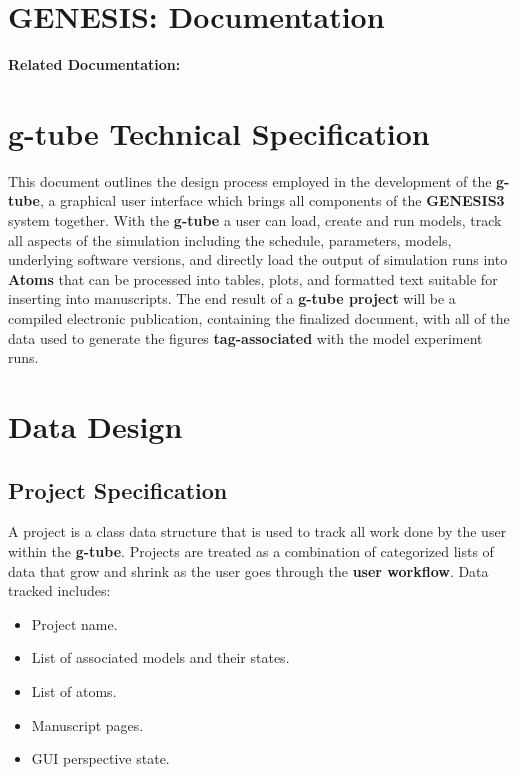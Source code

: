 \documentclass[12pt]{article}
\begin{document}
\section*{GENESIS: Documentation}

{\bf Related Documentation:}

\section*{g-tube Technical Specification}

	This document outlines the design process employed in the development of the {\bf g-tube}, a graphical user interface which brings all components of the {\bf GENESIS3} system together. With the {\bf g-tube} a user can load, create and run models, track all aspects of the simulation including the schedule, parameters, models, underlying software versions, and directly load the output of simulation runs into {\bf Atoms} that can be processed into tables, plots, and formatted text suitable for inserting into manuscripts. The end result of a {\bf g-tube project} will be a compiled electronic publication, containing the finalized document, with all of the data used to generate the figures {\bf tag-associated}  with the model experiment runs. 


\section*{Data Design}

\subsection*{Project Specification}

	A project is a class data structure that is used to track all work done by the user within the {\bf g-tube}. Projects are treated as a combination of categorized lists of data that grow and shrink as the user goes through the {\bf user workflow}. Data tracked includes:
	
\begin{itemize}
	\item[] Project name.
	\item[] List of associated models and their states.
	\item[] List of atoms.
	\item[] Manuscript pages.
	\item[] GUI perspective state.
\end{itemize}
\end{document}
